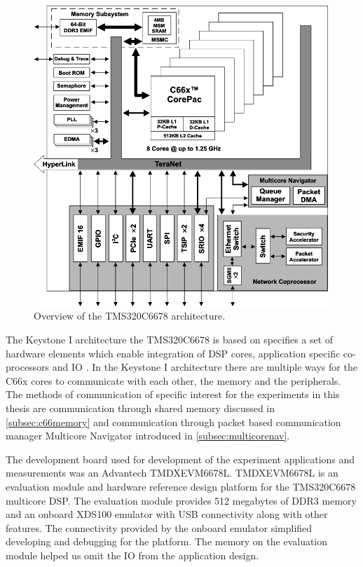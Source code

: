 \begin{figure}[h!]
    \label{arch_overview}
    \begin{center}
        \includegraphics[width=0.99\textwidth]{images/fbd_SPRS691e.png} 
        \caption{Overview of the TMS320C6678 architecture.}
    \end{center}
\end{figure}

The Keystone I architecture the TMS320C6678 is based on specifies a set of
hardware elements which enable integration of DSP cores, application specific
co-processors and IO \cite{tmsdatasheet}. In the Keystone I architecture there
are multiple ways for the C66x cores to communicate with each other, the memory
and the peripherals. The methods of communication of specific interest for the
experiments in this thesis are communication through shared memory discussed in
\ref{subsec:c66memory} and communication through packet based communication
manager Multicore Navigator introduced in \ref{subsec:multicorenav}.

The development board used for development of the experiment applications and 
measurements was an Advantech TMDXEVM6678L. TMDXEVM6678L is an evaluation module
and hardware reference design platform for the TMS320C6678 multicore DSP. The
evaluation module provides 512 megabytes of DDR3 memory and an onboard XDS100
emulator with USB connectivity along with other features. \cite{evmref} The 
connectivity provided by the onboard emulator simplified developing and
debugging for the platform. The memory on the evaluation module helped us omit
the IO from the application design.

